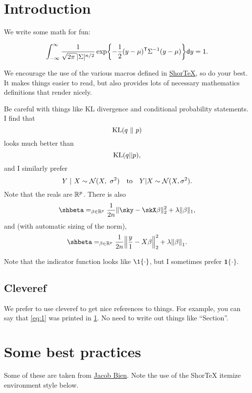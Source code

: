 \documentclass[12pt]{article}
\let\argmin\relax\DeclareMathOperator*{\argmin}{argmin}
\renewcommand{\d}{\mathsf{d}}
\begin{document}
\section{Introduction}\label{sec:intro}

We write some math for fun:

\[
\label{eq:1}
\int_{-\infty}^{\infty} \frac{1}{\sqrt{2\pi}|\Sigma|^{n/2}}
\exp\cbra*{-\frac{1}{2}(y - \mu)\T \Sigma^{-1} (y-\mu)} \d y = 1.
\]

We encourage the use of the various macros defined in
\href{https://github.com/trevorcampbell/shortex/}{ShorTeX},
so do your best. It makes things easier to read, but also provides lots of
necessary mathematics definitions that render nicely. 

Be careful with things like KL divergence and conditional probability
statements. I find that 
\[\KL(q\ \Vert\ p)\]
looks much better than 
\[\operatorname{KL}(q||p),\] 
and I similarly prefer 
\[
Y\ |\ X \sim \mathcal{N}(X,\ \sigma^2) 
\quad\textrm{to}\quad Y | X \sim \mathcal{N}(X,\sigma^2).
\] 
Note that the reals are $\mathbb{R}^p$. There is also
\[
\shbeta = \argmin_{\beta \in \reals^p} \frac{1}{2n}\norm{\sky - \skX\beta}_2^2 + 
\lambda \norm{\beta}_1,
\]
and (with automatic sizing of the norm),
\[
\shbeta = \argmin_{\beta \in \reals^p} \frac{1}{2n}\norm*{\frac{y}{1} - X\beta}_2^2 + 
\lambda \norm*{\beta}_1.
\]

Note that the indicator function looks like $\1\{\cdot\}$, but I sometimes
prefer $\mathbf{1}\{\cdot\}$.




\subsection{Cleveref}\label{sec:clever}

We prefer to use cleveref to get nice references to things. For example, you can
say that \cref{eq:1} was printed in \cref{sec:intro}. No need to write out
things like ``Section''.

\section{Some best practices}

Some of these are taken from
\href{http://faculty.marshall.usc.edu/Jacob-Bien/papers/manuscript-checklist.pdf}{Jacob
Bien}. Note the use of the ShorTeX itemize environment style below.
\end{document}
